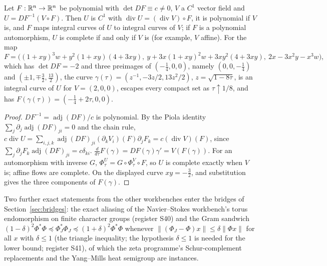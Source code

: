 \begin{lemma}\label{lem:keller}
Let $F:\mathbb{R}^n\to\mathbb{R}^n$ be polynomial with $\det DF\equiv c\ne0$, $V$ a $C^1$ vector field and $U=DF^{-1}(V\circ F)$. Then $U$ is $C^1$ with $\operatorname{div}U=(\operatorname{div}V)\circ F$, it is polynomial if $V$ is, and $F$ maps integral curves of $U$ to integral curves of $V$; if $F$ is a polynomial automorphism, $U$ is complete if and only if $V$ is (for example, $V$ affine).
For the map
\[
F=\big((1+xy)^3w+y^2(1+xy)(4+3xy),\ y+3x(1+xy)^2w+3xy^2(4+3xy),\ 2x-3x^2y-x^3w\big),
\]
which has $\det DF=-2$ and three preimages of $(-\tfrac14,0,0)$, namely $(0,0,-\tfrac14)$ and $(\pm1,\mp\tfrac32,\tfrac{13}2)$, the curve $\gamma(\tau)=(z^{-1},-3z/2,13z^2/2)$, $z=\sqrt{1-8\tau}$, is an integral curve of $U$ for $V=(2,0,0)$, escapes every compact set as $\tau\uparrow1/8$, and has $F(\gamma(\tau))=(-\tfrac14+2\tau,0,0)$.
\end{lemma}

\begin{proof}
$DF^{-1}=\operatorname{adj}(DF)/c$ is polynomial. By the Piola identity $\sum_j\partial_j\operatorname{adj}(DF)_{ji}=0$ and the chain rule, $c\operatorname{div}U=\sum_{i,j,k}\operatorname{adj}(DF)_{ji}(\partial_kV_i)(F)\partial_jF_k=c(\operatorname{div}V)(F)$, since $\sum_j\partial_jF_k\operatorname{adj}(DF)_{ji}=c\delta_{ki}$. $\frac d{d\tau}F(\gamma)=DF(\gamma)\gamma'=V(F(\gamma))$. For an automorphism with inverse $G$, $\Phi^U_\tau=G\circ\Phi^V_\tau\circ F$, so $U$ is complete exactly when $V$ is; affine flows are complete. On the displayed curve $xy=-\tfrac32$, and substitution gives the three components of $F(\gamma)$.
\end{proof}

Two further exact statements from the other workbenches enter the bridges of Section~\ref{sec:bridges}: the exact aliasing of the Navier--Stokes workbench's torus endomorphism on finite character groups (register S40) and the Gram sandwich $(1-\delta)^2\Phi^*\Phi\preceq\Phi_J^*\Phi_J\preceq(1+\delta)^2\Phi^*\Phi$ whenever $\|(\Phi_J-\Phi)x\|\le\delta\|\Phi x\|$ for all $x$ with $\delta\le1$ (the triangle inequality; the hypothesis $\delta\le1$ is needed for the lower bound; register S41), of which the zeta programme's Schur-complement replacements and the Yang--Mills heat semigroup are instances.
